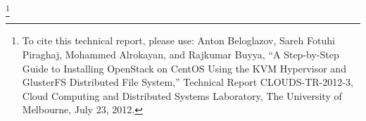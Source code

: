 \thanks{To cite this technical report, please use: Anton Beloglazov, Sareh Fotuhi Piraghaj, Mohammed Alrokayan, and Rajkumar Buyya, ``A Step-by-Step Guide to Installing OpenStack on CentOS Using the KVM Hypervisor and GlusterFS Distributed File System,'' Technical Report CLOUDS-TR-2012-3, Cloud Computing and Distributed Systems Laboratory, The University of Melbourne, July 23, 2012.}
